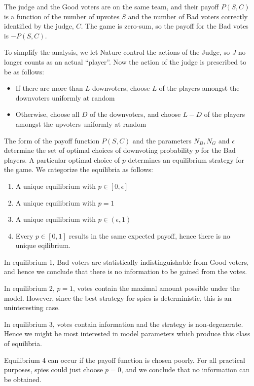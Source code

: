 \documentclass[11pt]{article}
\begin{document}
The judge and the Good voters are on the same team, and their payoff
$P(S, C)$ is a function of the number of upvotes $S$ and the number of
Bad voters correctly identified by the judge, $C$.  The game is
zero-sum, so the payoff for the Bad votes is $-P(S, C)$.

To simplify the analysis, we let Nature control the actions of the Judge, so $J$ no longer counts as an actual ``player''.  Now the action of the judge is prescribed to be as follows:
\begin{itemize}
\item If there are more than $L$ downvoters, choose $L$ of the players amongst the downvoters uniformly at random
\item Otherwise, choose all $D$ of the downvoters, and choose $L - D$ of the players amongst the upvoters uniformly at random
\end{itemize}

The form of the payoff function $P(S,C)$ and the parameters $N_B, N_G$
and $\epsilon$ determine the set of optimal choices of downvoting
probability $p$ for the Bad players.  A particular optimal choice of
$p$ determines an equilibrium strategy for the game.  We categorize
the equilibria as follows:
\begin{enumerate}
\item A unique equilibrium with $p \in [0, \epsilon]$
\item A unique equilibrium with $p = 1$
\item A unique equilibrium with $p \in (\epsilon, 1)$
\item Every $p \in [0,1]$ results in the same expected payoff, hence
  there is no unique eqilibrium.
\end{enumerate}

In equilibrium 1, Bad voters are statistically indistinguishable from
Good voters, and hence we conclude that there is no information to be
gained from the votes.

In equilibrium 2, $p=1$, votes contain the maximal amount possible
under the model.  However, since the best strategy for spies is
deterministic, this is an uninteresting case.

In equilibrium 3, votes contain information and the strategy is
non-degenerate.  Hence we might be most interested in model parameters
which produce this class of equilibria.

Equilibrium 4 can occur if the payoff function is chosen poorly.  For
all practical purposes, spies could just choose $p=0$, and we conclude
that no information can be obtained.
\end{document}
